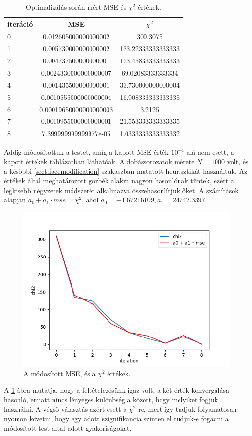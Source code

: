 \begin{table}[h!]
	\centering
	\caption{Optimalizálás során mért MSE és $\chi^2$ értékek.}
	\label{tab:compare}
	\begin{tabular}{l|c|c|}
		iteráció & MSE & $\chi^2$ \\
		\hline
		0 & 0.012605000000000002 & 309.3075 \\
		1 & 0.005730000000000002 & 133.22333333333333 \\
		2 & 0.004737500000000001 & 123.45833333333333 \\
		3 & 0.0024330000000000007 & 69.02083333333334 \\
		4 & 0.001435500000000001 & 33.730000000000004 \\
		5 & 0.0010555000000000004 & 16.908333333333335 \\
		6 & 0.00019650000000000003 & 3.2125 \\
		7 & 0.0010955000000000001 & 21.553333333333335 \\
		8 & 7.399999999999977e-05 & 1.0333333333333332 \\
		\hline
	\end{tabular}
\end{table}

Addig módosítottuk a testet, amíg a kapott MSE érték $10^{-4}$ alá nem esett, a kapott értékek  táblázatban láthatóak.
A dobássorozatok mérete $N=1000$ volt, és a későbbi \ref{sect:facemodification} szakaszban mutatott heurisztikát használtuk.
Az értékek által meghatározott görbék alakra nagyon hasonlónak tűntek, ezért a legkisebb négyzetek módszerét alkalmazva összehasonlítjuk őket.
A számítások alapján $a_0 + a_1\cdot mse = \chi^2$, ahol $a_0 = -1.67216109, a_1 = 24742.3397$.
\begin{figure}[h!]
	\centering
	\includegraphics[scale=0.7]{images/mse_vs_chi2.png}
	\caption{A módosított MSE, és a $\chi^2$ értékek.}
	\label{fig:mse_vs_chi2}
\end{figure}
A \ref{fig:mse_vs_chi2} ábra mutatja, hogy a feltételezésünk igaz volt, a két érték konvergálása hasonló, emiatt nincs lényeges különbség a között, hogy melyiket fogjuk használni.
A végső választás azért esett a $\chi^2$-re, mert így tudjuk folyamatosan nyomon követni, hogy egy adott szignifikancia szinten el tudjuk-e fogadni a módosított test által adott gyakoriságokat.

